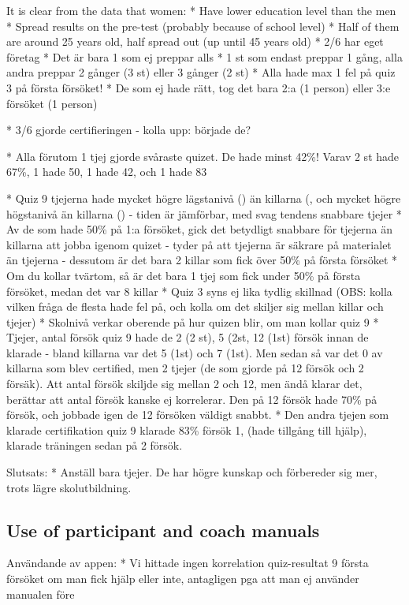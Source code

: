 It is clear from the data that women:
* Have lower education level than the men
* Spread results on the pre-test (probably because of school level)
* Half of them are around 25 years old, half spread out (up until 45 years old)
* 2/6 har eget företag
* Det är bara 1 som ej preppar alls
* 1 st som endast preppar 1 gång, alla andra preppar 2 gånger (3 st) eller 3 gånger (2 st)
* Alla hade max 1 fel på quiz 3 på första försöket!
* De som ej hade rätt, tog det bara 2:a (1 person) eller 3:e försöket (1 person)

* 3/6 gjorde certifieringen - kolla upp: började de?

* Alla förutom 1 tjej gjorde svåraste quizet. De hade minst 42\%! Varav 2 st hade 67\%, 1 hade 50, 1 hade 42, och 1 hade 83

* Quiz 9 tjejerna hade mycket högre lägstanivå () än killarna (, och mycket högre högstanivå än killarna () - tiden är jämförbar, med svag tendens snabbare tjejer
* Av de som hade 50\% på 1:a försöket, gick det betydligt snabbare för tjejerna än killarna att jobba igenom quizet - tyder på att tjejerna är säkrare på materialet än tjejerna - dessutom är det bara 2 killar som fick över 50\% på första försöket
* Om du kollar tvärtom, så är det bara 1 tjej som fick under 50\% på första försöket, medan det var 8 killar
* Quiz 3 syns ej lika tydlig skillnad (OBS: kolla vilken fråga de flesta hade fel på, och kolla om det skiljer sig mellan killar och tjejer)
* Skolnivå verkar oberende på hur quizen blir, om man kollar quiz 9
* Tjejer, antal försök quiz 9 hade de 2 (2 st), 5 (2st, 12 (1st) försök innan de klarade - bland killarna var det 5 (1st) och 7 (1st). Men sedan så var det 0 av killarna som blev certified, men 2 tjejer (de som gjorde på 12 försök och 2 försäk). Att antal försök skiljde sig mellan 2 och 12, men ändå klarar det, berättar att antal försök kanske ej korrelerar. Den på 12 försök hade 70\% på försök, och jobbade igen de 12 försöken väldigt snabbt.
* Den andra tjejen som klarade certifikation quiz 9 klarade 83\% försök 1, (hade tillgång till hjälp), klarade träningen sedan på 2 försök.

Slutsats:
* Anställ bara tjejer. De har högre kunskap och förbereder sig mer, trots lägre skolutbildning.

\subsection{Use of participant and coach manuals}

Användande av appen:
* Vi hittade ingen korrelation quiz-resultat 9 första försöket om man fick hjälp eller inte, antagligen pga att man ej använder manualen före

